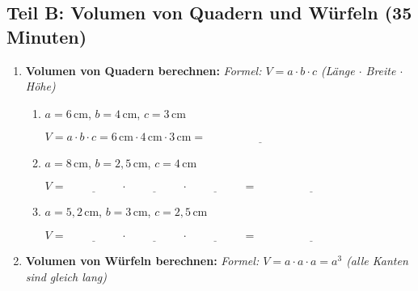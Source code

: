 \subsection*{Teil B: Volumen von Quadern und Würfeln (35 Minuten)}

\begin{enumerate}[label=\arabic*.]
    \item \textbf{Volumen von Quadern berechnen:}
    \textit{Formel: $V = a \cdot b \cdot c$ (Länge $\cdot$ Breite $\cdot$ Höhe)}
    \vspace{0.5cm}

    \begin{enumerate}[label=\alph*)]
        \item $a = 6\,\text{cm}$, $b = 4\,\text{cm}$, $c = 3\,\text{cm}$

        $V = a \cdot b \cdot c = 6\,\text{cm} \cdot 4\,\text{cm} \cdot 3\,\text{cm} = \underline{\hspace{4cm}}$

        \vspace{0.5cm}

        \item $a = 8\,\text{cm}$, $b = 2{,}5\,\text{cm}$, $c = 4\,\text{cm}$

        $V = \underline{\hspace{2cm}} \cdot \underline{\hspace{2cm}} \cdot \underline{\hspace{2cm}} = \underline{\hspace{4cm}}$

        \vspace{0.5cm}

        \item $a = 5{,}2\,\text{cm}$, $b = 3\,\text{cm}$, $c = 2{,}5\,\text{cm}$

        $V = \underline{\hspace{2cm}} \cdot \underline{\hspace{2cm}} \cdot \underline{\hspace{2cm}} = \underline{\hspace{4cm}}$
    \end{enumerate}

    \vspace{1cm}

    \item \textbf{Volumen von Würfeln berechnen:}
    \textit{Formel: $V = a \cdot a \cdot a = a^3$ (alle Kanten sind gleich lang)}
    \vspace{0.5cm}


\end{enumerate}
